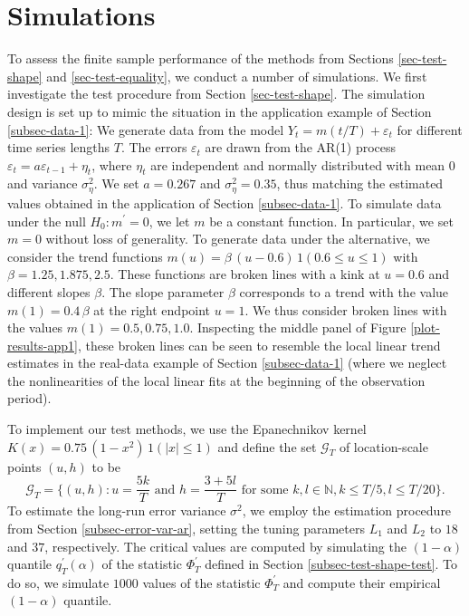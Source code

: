 
\section{Simulations}\label{sec-sim}


To assess the finite sample performance of the methods from Sections \ref{sec-test-shape} and \ref{sec-test-equality}, we conduct a number of simulations. We first investigate the test procedure from Section \ref{sec-test-shape}. The simulation design is set up to mimic the situation in the application example of Section \ref{subsec-data-1}: We generate data from the model $Y_t = m(t/T) + \varepsilon_t$ for different time series lengths $T$. The errors $\varepsilon_t$ are drawn from the AR(1) process $\varepsilon_t = a \varepsilon_{t-1} + \eta_t$, where $\eta_t$ are independent and normally distributed with mean $0$ and variance $\sigma_\eta^2$. We set $a = 0.267$ and $\sigma_\eta^2 = 0.35$, thus matching the estimated values obtained in the application of Section \ref{subsec-data-1}. To simulate data under the null $H_0: m^\prime = 0$, we let $m$ be a constant function. In particular, we set $m = 0$ without loss of generality. To generate data under the alternative, we consider the trend functions $m(u) = \beta \, (u - 0.6) \, 1(0.6 \le u \le 1)$ with $\beta = 1.25, 1.875, 2.5$. These functions are broken lines with a kink at $u = 0.6$ and different slopes $\beta$. The slope parameter $\beta$ corresponds to a trend with the value $m(1) = 0.4 \, \beta$ at the right endpoint $u = 1$. We thus consider broken lines with the values $m(1) = 0.5, 0.75, 1.0$. Inspecting the middle panel of Figure \ref{plot-results-app1}, these broken lines can be seen to resemble the local linear trend estimates in the real-data example of Section \ref{subsec-data-1} (where we neglect the nonlinearities of the local linear fits at the beginning of the observation period). 


To implement our test methods, we use the Epanechnikov kernel $K(x) = 0.75 \, (1 - x^2) \, 1(|x| \le 1)$ and define the set $\mathcal{G}_T$ of location-scale points $(u,h)$ to be 
\begin{equation}\label{grid-sim-app}
\mathcal{G}_T = \{(u, h): u = \frac{5k}{T} \text{ and } h = \frac{3+5l}{T} \text{ for some } k, l \in \mathbb{N}, k \le T/5, l \le T/20\}. 
\end{equation}
To estimate the long-run error variance $\sigma^2$, we employ the estimation procedure from Section \ref{subsec-error-var-ar}, setting the tuning parameters $L_1$ and $L_2$ to $18$ and $37$, respectively. The critical values are computed by simulating the $(1-\alpha)$ quantile $q_T^\prime(\alpha)$ of the statistic $\Phi^\prime_T$ defined in Section \ref{subsec-test-shape-test}. To do so, we simulate $1000$ values of the statistic $\Phi^\prime_T$ and compute their empirical $(1-\alpha)$ quantile. 


